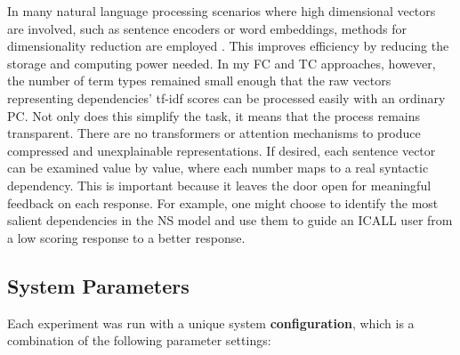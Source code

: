 In many natural language processing scenarios where high dimensional vectors are involved, such as sentence encoders or word embeddings, methods for dimensionality reduction are employed \citep{BertDevlin2018,word2vec}. This improves efficiency by reducing the storage and computing power needed. In my FC and TC approaches, however, the number of term types remained small enough that the raw vectors representing dependencies' tf-idf scores can be processed easily with an ordinary PC. Not only does this simplify the task, it means that the process remains transparent. There are no transformers or attention mechanisms to produce compressed and unexplainable representations.  If desired, each sentence vector can be examined value by value, where each number maps to a real syntactic dependency. This is important because it leaves the door open for meaningful feedback on each response. For example, one might choose to identify the most salient dependencies in the NS model and use them to guide an ICALL user from a low scoring response to a better response.

\subsection{System Parameters}
\label{sec:parameters}

Each experiment was run with a unique system \textbf{configuration}, which is a combination of the following parameter settings:

